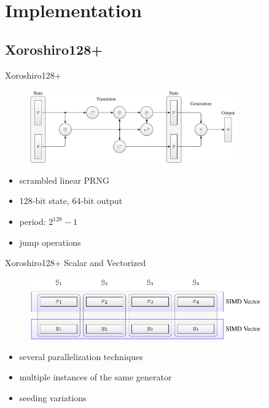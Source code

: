 \documentclass[aspectratio=169]{beamer}
\begin{document}
  \section{Implementation} %
  \label{sec:implementation}
    \subsection{Xoroshiro128+}
    \begin{frame}{Xoroshiro128+}
      \begin{figure}
        \includegraphics[width=0.8\textwidth]{figures/xrsr128p_scheme.pdf}
      \end{figure}
      \begin{itemize}
        \item scrambled linear PRNG
        \item 128-bit state, 64-bit output
        \item period: $2^{128}-1$
        \item jump operations
      \end{itemize}
    \end{frame}

    \begin{frame}{Xoroshiro128+ Scalar and Vectorized}
      \begin{figure}
        \includegraphics[width=0.9\textwidth]{figures/xrsr128p_vector_layout.pdf}
      \end{figure}
      \begin{itemize}
        \item several parallelization techniques
        \item multiple instances of the same generator
        \item seeding variations
      \end{itemize}
    \end{frame}
\end{document}
